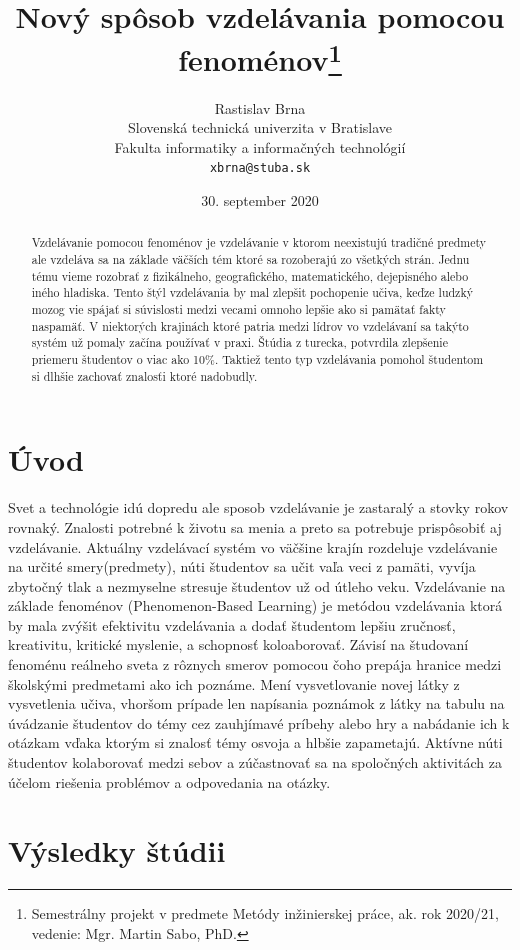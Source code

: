 \documentclass[10pt,slovak,a4paper]{article}
\title{Nový spôsob vzdelávania pomocou fenoménov\thanks{Semestrálny projekt v predmete Metódy inžinierskej práce, ak. rok 2020/21, vedenie: Mgr. Martin Sabo, PhD.}} %
\author{Rastislav Brna\\[2pt]
	{\small Slovenská technická univerzita v Bratislave}\\
	{\small Fakulta informatiky a informačných technológií}\\
	{\small \texttt{xbrna@stuba.sk}}
	}
\date{\small 30. september 2020} %
\begin{document}
\maketitle

\begin{abstract}
	Vzdelávanie pomocou fenoménov je vzdelávanie v ktorom neexistujú 
	tradičné predmety ale vzdeláva sa na základe väčších tém ktoré sa rozoberajú zo všetkých strán.
	Jednu tému vieme rozobrať z fizikálneho, geografického, matematického, dejepisného alebo iného 
	hladiska. Tento štýl vzdelávania by mal zlepšit pochopenie učiva, keďze ludzký mozog vie spájať 
	si súvislosti medzi vecami omnoho lepšie ako si pamätať fakty naspamäť. V niektorých krajinách ktoré
	patria medzi lídrov vo vzdelávaní sa takýto systém už pomaly začína používať v praxi. Štúdia z turecka,
	potvrdila zlepšenie priemeru študentov o viac ako 10\%. Taktiež tento typ vzdelávania pomohol študentom 
	si dlhšie zachovať znalosťi ktoré nadobudly.\cite{jcer553507} 
\end{abstract}

\section{Úvod}

Svet a technológie idú dopredu ale sposob vzdelávanie je zastaralý a stovky rokov rovnaký. Znalosti potrebné k
životu sa menia a preto sa potrebuje prispôsobiť aj vzdelávanie. Aktuálny vzdelávací systém vo väčšine krajín 
rozdeluje vzdelávanie na určité smery(predmety), núti študentov sa učit vaľa veci z pamäti, vyvíja zbytočný tlak
a nezmyselne stresuje študentov už od útleho veku. Vzdelávanie na základe
fenoménov (Phenomenon-Based Learning) je metódou vzdelávania ktorá by mala zvýšit efektivitu vzdelávania
a dodať študentom lepšiu zručnosť, kreativitu, kritické myslenie, a schopnosť koloaborovať. Závisí na študovaní
fenoménu reálneho sveta z rôznych smerov pomocou čoho prepája hranice medzi školskými predmetami ako ich poznáme.
Mení vysvetlovanie novej látky z vysvetlenia učiva, vhoršom prípade len napísania poznámok z látky na tabulu na úvádzanie
študentov do témy cez zauhjímavé príbehy alebo hry a nabádanie ich k otázkam vďaka ktorým si znalosť témy osvoja a hlbšie zapametajú.
Aktívne núti študentov kolaborovať medzi sebov a zúčastnovať sa na spoločných aktivitách za účelom riešenia
problémov a odpovedania na otázky. 

\section{Výsledky štúdii}
\end{document}
